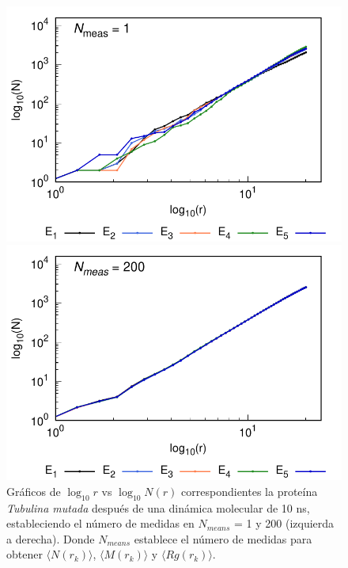 	\begin{figure}[H]
		\hspace{-0.3cm} 
		\begin{minipage}{0.49\textwidth}
			\centering
			\includegraphics[width=\linewidth,page=1]{graphs/PDBs/Tubb4/TubMutA=1.pdf}
		\end{minipage}
		\hspace{0.2cm}
		\begin{minipage}{0.49\textwidth}
			\centering
			\includegraphics[width=\linewidth,page=1]{graphs/PDBs/Tubb4/TubMutA=200.pdf}
		\end{minipage}
		
		\caption{
			Gr\'{a}ficos de $\log_{10}r$ vs $\log_{10}N(r)$ correspondientes la prote\'{i}na \textit{Tubulina mutada} despu\'{e}s de una din\'{a}mica molecular de 10 ns, estableciendo el n\'{u}mero de medidas en  $N_{means}$ = 1 y 200 (izquierda a derecha). Donde $N_{means}$ establece el n\'{u}mero de medidas para obtener $\langle N(r_k) \rangle$, $\langle M(r_k) \rangle$ y $\langle Rg(r_k) \rangle$.}
		\label{fig:Nmeasp}
	\end{figure}
	
